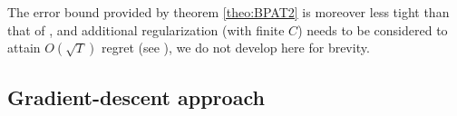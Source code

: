 \documentclass[preprint,12pt,authoryear]{elsarticle}
\begin{document}
The error bound provided by theorem \ref{theo:BPAT2} is moreover less tight than that of \cite{freund1997decision}, and  additional regularization (with finite $C$) needs to be considered to attain $O(\sqrt{T})$ regret (see \cite{crammer2006online}),  
we do not develop here for brevity. 





\subsection{Gradient-descent approach}
\end{document}
